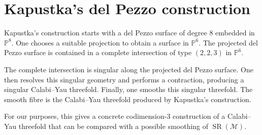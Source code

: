 \section{Kapustka's del Pezzo construction}
\label{section-kapustka-del-pezzo}

\noindent
Kapustka's construction starts with a del Pezzo surface
of degree $8$ embedded in $\mathbb{P}^8$.
One chooses a suitable projection to obtain a surface
in $\mathbb{P}^6$.
The projected del Pezzo surface is contained in a
complete intersection of type $(2,2,3)$ in
$\mathbb{P}^6$.

The complete intersection is singular along the
projected del Pezzo surface.
One then resolves this singular geometry and performs
a contraction, producing a singular Calabi--Yau
threefold.
Finally, one smooths this singular threefold.
The smooth fibre is the Calabi--Yau threefold produced
by Kapustka's construction.

For our purposes, this gives a concrete codimension-$3$
construction of a Calabi--Yau threefold that can be
compared with a possible smoothing of
$\operatorname{SR}(\mathcal{M})$.


